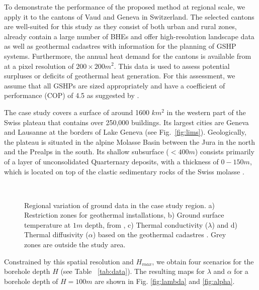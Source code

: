 To demonstrate the performance of the proposed method at regional scale, we apply it to the cantons of Vaud and Geneva in Switzerland. 
The selected cantons are well-suited for this study as they consist of both urban and rural zones, already contain a large number of BHEs
and offer high-resolution landscape data as well as geothermal cadastres with information for the planning of GSHP systems.
Furthermore, the annual heat demand for the cantons is available from \citet{schneider_spatialtemporal_2017} at a pixel resolution of $200 \times 200 m^2$. 
This data is used to assess potential surpluses or deficits of geothermal heat generation.
For this assessment, we assume that all GSHPs are sized appropriately and have a coefficient of performance (COP) of 4.5 as suggested by \citet{galgaro_empirical_2015}.

The case study covers a surface of around 1600 $km^2$ in the western part of the Swiss plateau that contains over 250,000 buildings. 
Its largest cities are Geneva and Lausanne at the borders of Lake Geneva (see Fig.~\ref{fig:lims}).
Geologically, the plateau is situated in the alpine Molasse Basin between the Jura in the north and the Prealps in the south. 
Its shallow subsurface ($< 400m$) consists primarily of a layer of unconsolidated Quarternary deposits, with a thickness of $0 - 150m$, which is located on top of the clastic sedimentary rocks of the Swiss molasse \cite{allenbach_geomol_2105}. %

\begin{figure}[!ht] %
\centering
{} \\
\caption{Regional variation of ground data in the case study region. a) Restriction zones for geothermal installations, b) Ground surface temperature at $1m$ depth, from \citet{assouline_machine_2019}, c) Thermal conductivity ($\lambda$) and d) Thermal diffusivity ($\alpha$) based on the geothermal cadastres \cite{asit_vd_cadastre_2019, sitg_cadastre_2019}. Grey zones are outside the study area.}
\label{fig:data}
\end{figure}
Constrained by this spatial resolution and $H_{max}$, we obtain four scenarios for the borehole depth $H$ (see Table ~\ref{tab:data}).
The resulting maps for $\lambda$ and $\alpha$ for a borehole depth of $H = 100m$ are shown in Fig. \ref{fig:lambda} and \ref{fig:alpha}.


